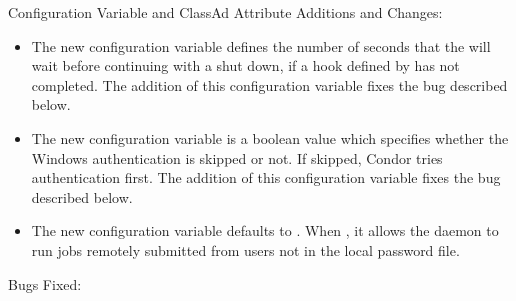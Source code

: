 \noindent Configuration Variable and ClassAd Attribute Additions and Changes:

\begin{itemize}

\item The new configuration variable 
defines the number of seconds that the  will wait
before continuing with a shut down,
if a hook defined by  has not completed.
The addition of this configuration variable fixes the bug described below.

\item The new configuration variable  
is a boolean value which specifies whether the Windows
 authentication is skipped or not.
If skipped, Condor tries  authentication first.
The addition of this configuration variable fixes the bug described below.

\item The new configuration variable  
defaults to .
When , 
it allows the  daemon to run jobs remotely submitted from 
users not in the local password file.

\end{itemize}
\noindent Bugs Fixed:

